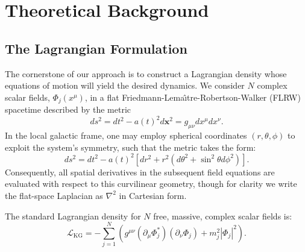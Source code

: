 
\section{Theoretical Background}
\label{sec:theory}

\subsection{The Lagrangian Formulation}
\label{subsec:lagrangian}

The cornerstone of our approach is to construct a Lagrangian density whose equations of motion will yield the desired dynamics. We consider $N$ complex scalar fields, $\Phi_j(x^\mu)$, in a flat Friedmann-Lema\^{\i}tre-Robertson-Walker (FLRW) spacetime described by the metric
\begin{equation}
ds^2 = dt^2 - a(t)^2 d\mathbf{x}^2 = g_{\mu\nu}dx^\mu dx^\nu .
\end{equation}
In the local galactic frame, one may employ spherical coordinates $(r, \theta, \phi)$ to exploit the system's symmetry, such that the metric takes the form:
\begin{equation}
ds^2 = dt^2 - a(t)^2 [dr^2 + r^2(d\theta^2 + \sin^2\theta d\phi^2)] .
\end{equation}
Consequently, all spatial derivatives in the subsequent field equations are evaluated with respect to this curvilinear geometry, though for clarity we write the flat-space Laplacian as $\nabla^2$ in Cartesian form.

The standard Lagrangian density for $N$ free, massive, complex scalar fields is:
\begin{equation}
    \mathcal{L}_{\text{KG}} = -\sum_{j=1}^N \left( g^{\mu\nu} (\partial_\mu \Phi_j^*) (\partial_\nu \Phi_j) + m_j^2 |\Phi_j|^2 \right) .
\end{equation}

